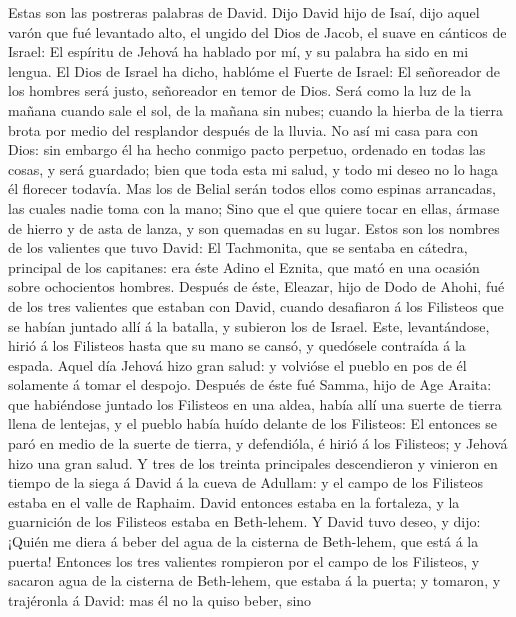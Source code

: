 Estas son las postreras palabras de David. Dijo David hijo
de Isaí, dijo aquel varón que fué levantado alto, el ungido del Dios de
Jacob, el suave en cánticos de Israel:  El espíritu de
Jehová ha hablado por mí, y su palabra ha sido en mi lengua.
 El Dios de Israel ha dicho, hablóme el Fuerte de Israel: El
señoreador de los hombres será justo, señoreador en temor de Dios.
 Será como la luz de la mañana cuando sale el sol, de la
mañana sin nubes; cuando la hierba de la tierra brota por medio del
resplandor después de la lluvia.  No así mi casa para con
Dios: sin embargo él ha hecho conmigo pacto perpetuo, ordenado en todas
las cosas, y será guardado; bien que toda esta mi salud, y todo mi deseo
no lo haga él florecer todavía.  Mas los de Belial serán
todos ellos como espinas arrancadas, las cuales nadie toma con la mano;
 Sino que el que quiere tocar en ellas, ármase de hierro y
de asta de lanza, y son quemadas en su lugar.  Estos son los
nombres de los valientes que tuvo David: El Tachmonita, que se sentaba
en cátedra, principal de los capitanes: era éste Adino el Eznita, que
mató en una ocasión sobre ochocientos hombres.  Después de
éste, Eleazar, hijo de Dodo de Ahohi, fué de los tres valientes que
estaban con David, cuando desafiaron á los Filisteos que se habían
juntado allí á la batalla, y subieron los de Israel.  Este,
levantándose, hirió á los Filisteos hasta que su mano se cansó, y
quedósele contraída á la espada. Aquel día Jehová hizo gran salud: y
volvióse el pueblo en pos de él solamente á tomar el despojo.
 Después de éste fué Samma, hijo de Age Araita: que
habiéndose juntado los Filisteos en una aldea, había allí una suerte de
tierra llena de lentejas, y el pueblo había huído delante de los
Filisteos:  El entonces se paró en medio de la suerte de
tierra, y defendióla, é hirió á los Filisteos; y Jehová hizo una gran
salud.  Y tres de los treinta principales descendieron y
vinieron en tiempo de la siega á David á la cueva de Adullam: y el campo
de los Filisteos estaba en el valle de Raphaim.  David
entonces estaba en la fortaleza, y la guarnición de los Filisteos estaba
en Beth-lehem.  Y David tuvo deseo, y dijo: ¡Quién me diera
á beber del agua de la cisterna de Beth-lehem, que está á la puerta!
 Entonces los tres valientes rompieron por el campo de los
Filisteos, y sacaron agua de la cisterna de Beth-lehem, que estaba á la
puerta; y tomaron, y trajéronla á David: mas él no la quiso beber, sino
